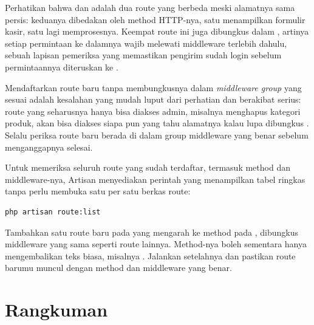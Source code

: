 Perhatikan bahwa  dan  adalah dua route
yang berbeda meski alamatnya sama persis: keduanya dibedakan oleh method
HTTP-nya, satu menampilkan formulir kasir, satu lagi memprosesnya. Keempat
route ini juga dibungkus dalam ,
artinya setiap permintaan ke dalamnya wajib melewati middleware
 terlebih dahulu, sebuah lapisan pemeriksa yang memastikan
pengirim sudah login sebelum permintaannya diteruskan ke
.

\begin{warningbox}
Mendaftarkan route baru tanpa membungkusnya dalam \textit{middleware group}
yang sesuai adalah kesalahan yang mudah luput dari perhatian dan berakibat
serius: route yang seharusnya hanya bisa diakses admin, misalnya menghapus
kategori produk, akan bisa diakses siapa pun yang tahu alamatnya kalau
lupa dibungkus . Selalu
periksa route baru berada di dalam group middleware yang benar sebelum
menganggapnya selesai.
\end{warningbox}

Untuk memeriksa seluruh route yang sudah terdaftar, termasuk method dan
middleware-nya, Artisan menyediakan perintah yang menampilkan tabel
ringkas tanpa perlu membuka satu per satu berkas route:

\begin{lstlisting}[language=bash]
php artisan route:list
\end{lstlisting}

\begin{challengebox}
Tambahkan satu route baru  pada
 yang mengarah ke method  pada
, dibungkus middleware  yang
sama seperti route  lainnya. Method-nya boleh sementara hanya
mengembalikan teks biasa, misalnya . Jalankan
 setelahnya dan pastikan route barumu muncul dengan
method dan middleware yang benar.
\end{challengebox}


\section{Rangkuman}
\label{sec:http-dan-mvc-rangkuman}

